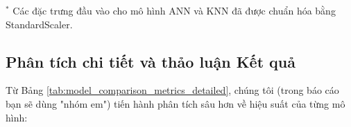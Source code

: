 \begin{table}[H] %
    \centering
    \caption{Bảng so sánh chi tiết các chỉ số đánh giá hiệu suất của các mô hình hồi quy trên tập kiểm tra. Các giá trị lỗi (MAE, RMSE) được hiểu theo đơn vị của biến mục tiêu (ví dụ: tấn/ha).}
    \label{tab:model_comparison_metrics_detailed}
    \footnotesize{$^*$ Các đặc trưng đầu vào cho mô hình ANN và KNN đã được chuẩn hóa bằng StandardScaler.}
\end{table}

\subsection{Phân tích chi tiết và thảo luận Kết quả}
\label{subsec:comparative_analysis_detailed}

Từ Bảng \ref{tab:model_comparison_metrics_detailed}, chúng tôi (trong báo cáo bạn sẽ dùng "nhóm em") tiến hành phân tích sâu hơn về hiệu suất của từng mô hình:

